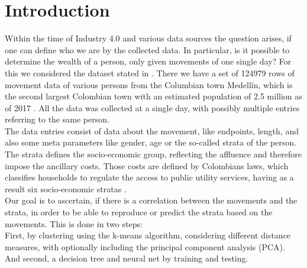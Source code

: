 \section{Introduction} \label{sec: introduction}
	Within the time of Industry 4.0 and various data sources the question arises, if one can define who we are by the collected data. In particular, is it possible to determine the wealth of a person, only given movements of one single day?
	For this we considered the dataset stated in \cite{rich_do_not_rise_early}. There we have a set of 124979 rows of movement data of various persons from the Columbian town Medellín, which is the second largest Colombian town with an estimated population of 2.5 million as of 2017 \cite{population_number} . All the data was collected at a single day, with possibly multiple entries referring to the same person.\\
	The data entries consist of data about the movement, like endpoints, length, and also some meta parameters like gender, age or the so-called strata of the person. The strata defines the socio-economic group, reflecting the affluence and therefore impose the ancillary costs. Those costs are defined by Colombians laws, which classifies households to regulate the access to public utility services, having as a result six socio-economic stratas \cite{rich_do_not_rise_early}.\\
	Our goal is to ascertain, if there is a correlation between the movements and the strata, in order to be able to reproduce or predict the strata based on the movements. This is done in two steps:\\
	First, by clustering using the k-means algorithm, considering different distance measures, with optionally including the principal component analysis (PCA).\\
	And second, a decision tree and neural net by training and testing.